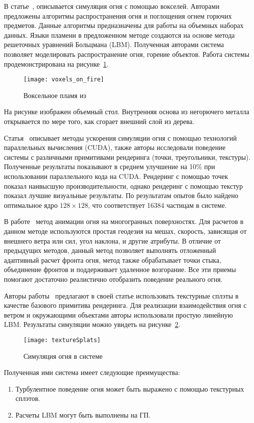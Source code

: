 В статье~\cite{Zhao2003VoxelsOF}, описывается симуляция огня с помощью вокселей.
Авторами предложены алгоритмы распространения огня и поглощения огнем горючих
предметов. Данные алгоритмы предназначены для работы на объемных наборах данных.
Языки пламени в предложенном методе создаются на основе метода решеточных
уравнений Больцмана (LBM). Полученная авторами система позволяет моделировать
распространение огня, горение объектов. Работа системы продемонстрирована на
рисунке~\ref{fig:voxelFire}.
\begin{figure}[htb]
	\centering
	\texttt{[image: voxels\_on\_fire]}
    \caption{Воксельное пламя из~\cite{Zhao2003VoxelsOF}}%
    \label{fig:voxelFire}
\end{figure}
На рисунке изображен объемный стол. Внутренняя основа из негорючего металла
открывается по мере того, как сгорает внешний слой из дерева.

Статья~\cite{Lyes2013FireAF} описывает методы ускорения симуляции огня с помощью
технологий параллельных вычисления (CUDA), также авторы исследовали поведение
системы с различными примитивами рендеринга (точки, треугольники, текстуры).
Полученные результаты показывают в среднем улучшение на 10\% при использовании
параллельного кода на CUDA\@. Рендеринг с помощью точек показал наивысшую
производительности, однако рендеринг с помощью текстур показал лучшие визуальные
результаты. По результатам опытов было найдено оптимальное ядро $128 \times
128$, что соответствует 16384 частицам в системе.

В работе~\cite{MeshesOnFire} метод анимации огня на многогранных поверхностях.
Для расчетов в данном методе используются простая геодезия на мешах, скорость,
зависящая от внешнего ветра или сил, угол наклона, и другие атрибуты. В отличие
от предыдущих методов, данный метод позволяет выполнять отложенный адаптивный
расчет фронта огня, метод также обрабатывает точки стыка, объединение фронтов и
поддерживает удаленное возгорание. Все эти приемы помогают достаточно
реалистично отобразить поведение реального огня.

Авторы работы~\cite{FireSplats} предлагают в своей статье использовать
текстурные сплэты в качестве базового примитива рендеринга. Для реализации
взаимодействия огня с ветром и окружающими объектами авторы использовали простую
линейную LBM\@. Результаты симуляции можно увидеть на
рисунке~\ref{fig:textureSplats}.
\begin{figure}[htb]
	\centering
    \texttt{[image: textureSplats]}
    \caption{Симуляция огня в системе~\cite{FireSplats}}%
    \label{fig:textureSplats}
\end{figure}
Полученная ими система имеет следующие преимущества:
\begin{enumerate}
    \item Турбулентное поведение огня может быть выражено с помощью текстурных
        сплэтов.
    \item Расчеты LBM могут быть выполнены на ГП.
\end{enumerate}

